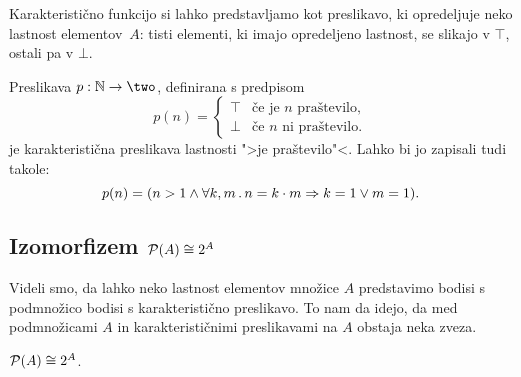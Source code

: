 Karakteristično funkcijo si lahko predstavljamo kot preslikavo, ki opredeljuje
neko lastnost elementov~$A$: tisti elementi, ki imajo opredeljeno lastnost, se
slikajo v $\top$, ostali pa v $\bot$.

\begin{zgled}
  Preslikava $p : \NN \to \two$, definirana s predpisom
  \begin{equation*}
    p(n) = 
    \begin{cases}
      \top & \text{če je $n$ praštevilo}, \\
      \bot & \text{če $n$ ni praštevilo}.
    \end{cases}
  \end{equation*}
  je karakteristična preslikava lastnosti ">je praštevilo"<. Lahko bi jo zapisali tudi takole:
  \begin{equation*}
    p(n) = (n > 1 \land \forall k, m \,.\, n = k \cdot m \Rightarrow k = 1 \lor m = 1).
  \end{equation*}
\end{zgled}


\subsection{Izomorfizem $\mathcal{P}(A) \cong 2^A$}

Videli smo, da lahko neko lastnost elementov množice $A$ predstavimo bodisi s
podmnožico bodisi s karakteristično preslikavo. To nam da idejo, da med
podmnožicami $A$ in karakterističnimi preslikavami na $A$ obstaja neka zveza.

\begin{izrek}
  $\mathcal{P}(A) \cong 2^A$.
\end{izrek}

